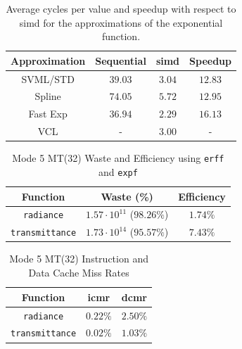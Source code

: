 \documentclass[a4paper, 11pt]{memoir}
\begin{document}
    \begin{table}[ht]
        \centering
        \begin{tabular}{|c|c|c|c|}
            \hline
            Approximation & Sequential & \gls{simd} & Speedup\\\hline
            SVML/STD & $39.03$ & $3.04$ & $12.83$\\
            Spline   & $74.05$ & $5.72$ & $12.95$\\
            Fast Exp & $36.94$ & $2.29$ & $16.13$\\
            VCL      & -       & $3.00$ & -\\
            \hline
        \end{tabular}
        \caption{Average cycles per value and speedup with respect to \gls{simd} for the approximations of the exponential function.}
        \label{tab:abs_cycles_and_speedups_exp}
    \end{table}

    \begin{table}[ht]
        \centering
        \begin{tabular}{|c|c|c|}
            \hline
            Function                        & Waste (\%)                       & Efficiency\\\hline
            \texttt{radiance}      & $1.57 \cdot 10^{11}$ ($98.26\%$) & $1.74\%$\\
            \texttt{transmittance} & $1.73 \cdot 10^{14}$ ($95.57\%$) & $7.43\%$ \\
            \hline
        \end{tabular}
        \caption{Mode 5 MT(32) Waste and Efficiency using \texttt{erff} and \texttt{expf}}
        \label{tab:mode_5_mt_wae}
    \end{table}

    \begin{table}[ht]
        \centering
        \begin{tabular}{|c|c|c|}
            \hline
            Function                        & icmr     & dcmr\\\hline
            \texttt{radiance}      & $0.22\%$ & $2.50\%$\\
            \texttt{transmittance} & $0.02\%$ & $1.03\%$ \\
            \hline
        \end{tabular}
        \caption{Mode 5 MT(32) Instruction and Data Cache Miss Rates}
        \label{tab:mode_5_mt_cmr}
    \end{table}
\end{document}
